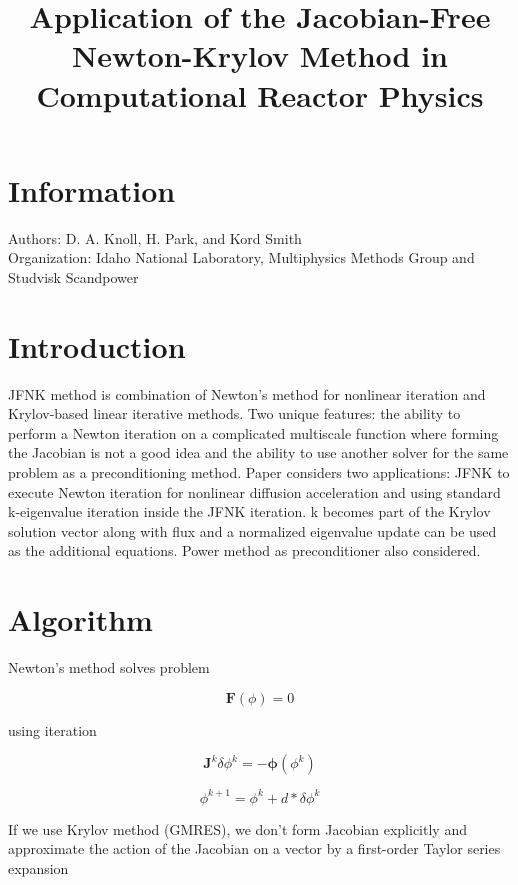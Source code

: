 \documentclass{article}
\title{Application of the Jacobian-Free Newton-Krylov Method in Computational Reactor Physics}
\date{\vspace{-5ex}}
\begin{document}
\maketitle

\section*{Information}

Authors: D. A. Knoll, H. Park, and Kord Smith \\

Organization: Idaho National Laboratory, Multiphysics Methods Group and Studvisk Scandpower

\section*{Introduction}

JFNK method is combination of Newton's method for nonlinear iteration and Krylov-based linear iterative methods. Two unique features: the ability to perform a Newton iteration on a complicated multiscale function where forming the Jacobian is not a good idea and the ability to use another solver for the same problem as a preconditioning method. Paper considers two applications: JFNK to execute Newton iteration for nonlinear diffusion acceleration and using standard k-eigenvalue iteration inside the JFNK iteration. k becomes part of the Krylov solution vector along with flux and a normalized eigenvalue update can be used as the additional equations. Power method as preconditioner also considered.

\section*{Algorithm}

Newton's method solves problem

\begin{equation*}
\mathbf{F}(\phi) = 0
\end{equation*}

using iteration

\begin{equation*}
\mathbf{J}^k \delta \phi^k = -\mathbf{\phi}(\phi^k)
\end{equation*}

\begin{equation*}
\phi^{k+1} = \phi^k + d * \delta \phi^k
\end{equation*}

If we use Krylov method (GMRES), we don't form Jacobian explicitly and approximate the action of the Jacobian on a vector by a first-order Taylor series expansion
\end{document}

